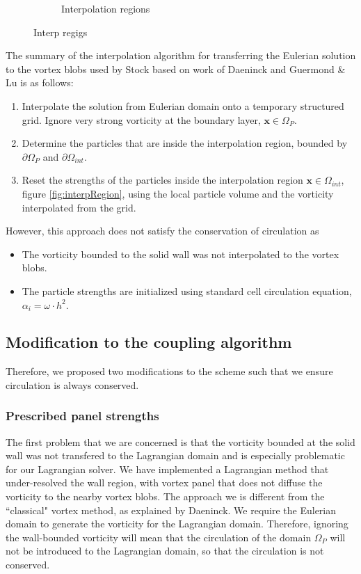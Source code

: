 \begin{figure}[t]
\begin{subfigure}[t]{0.6\textwidth}
             \caption{Interpolation regions}
             \label{fig:hybrid_domains_withInterpReg}
     \end{subfigure}

     \caption{Interp regigs}
     \label{fig:interpolationRegionDefinitions}
	\end{figure}	

The summary of the interpolation algorithm for transferring the Eulerian solution to the vortex blobs used by Stock based on work of Daeninck and Guermond \& Lu is as follows:
\begin{enumerate}
\item Interpolate the solution from Eulerian domain onto a temporary structured grid. Ignore very strong vorticity at the boundary layer, $\mathbf{x} \in \Omega_P$.
\item Determine the particles that are inside the interpolation region, bounded by $\partial \Omega_P$ and $\partial \Omega_{int}$.
\item Reset the strengths of the particles inside the interpolation region $\mathbf{x} \in \Omega_{int}$, figure \ref{fig:interpRegion}, using the local particle volume and the vorticity interpolated from the grid.
\end{enumerate}

However, this approach does not satisfy the conservation of circulation as
\begin{itemize}
\item The vorticity bounded to the solid wall was not interpolated to the vortex blobs.
\item The particle strengths are initialized using standard cell circulation equation, $\alpha_i = \omega \cdot h^2$.
\end{itemize}


\subsection*{Modification to the coupling algorithm}

Therefore, we proposed two modifications to the scheme such that we ensure circulation is always conserved.

\subsubsection*{Prescribed panel strengths}

The first problem that we are concerned is that the vorticity bounded at the solid wall was not transfered to the Lagrangian domain and is especially problematic for our Lagrangian solver. We have implemented a Lagrangian method that under-resolved the wall region, with vortex panel that does not diffuse the vorticity to the nearby vortex blobs. The approach we is different from the ``classical" vortex method, as explained by Daeninck. We require the Eulerian domain to generate the vorticity for the Lagrangian domain. Therefore, ignoring the wall-bounded vorticity will mean that the circulation of the domain $\Omega_P$ will not be introduced to the Lagrangian domain, so  that the circulation is not conserved.

